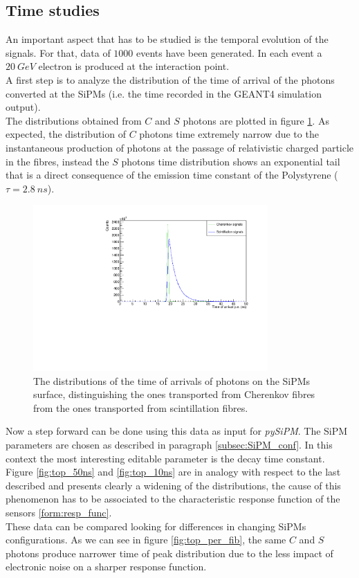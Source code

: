 \subsection{Time studies} \label{subsec:Time}
An important aspect that has to be studied is the temporal evolution of the signals.
For that, data of $1000$ events have been generated. In each event a $20\ GeV$ electron is produced at the interaction point.\\
A first step is to analyze the distribution of the time of arrival of the photons converted at the SiPMs (i.e. the time recorded in the GEANT4 simulation output).\\
The distributions obtained from $C$ and $S$ photons are plotted in figure \ref{fig:true_toa_dist}.
As expected, the distribution of $C$ photons time extremely narrow due to the instantaneous production of photons at the passage of relativistic charged particle in the fibres, instead the $S$ photons time distribution shows an exponential tail that is a direct consequence of the emission time constant of the Polystyrene ($\tau = 2.8\ ns$).\\

\begin{figure}
	\centering
	\includegraphics[width=0.8\textwidth]{IMG/Cap5/TrueTimeDist20GeV}
	\caption{The distributions of the time of arrivals of photons on the SiPMs surface, distinguishing the ones transported from Cherenkov fibres from the ones transported from scintillation fibres.}
	\label{fig:true_toa_dist}
\end{figure}

Now a step forward can be done using this data as input for \textit{pySiPM}. The SiPM parameters are chosen as described in paragraph \ref{subsec:SiPM_conf}. In this context the most interesting editable parameter is the decay time constant.\\ 
Figure \ref{fig:top_50ns} and \ref{fig:top_10ns} are in analogy with respect to the last described and presents clearly a widening of the distributions, the cause of this phenomenon has to be associated to the characteristic response function of the sensors \ref{form:resp_func}.\\
These data can be compared looking for differences in changing SiPMs configurations. As we can see in figure \ref{fig:top_per_fib}, the same $C$ and $S$ photons produce narrower time of peak distribution due to the less impact of electronic noise on a sharper response function.\\

